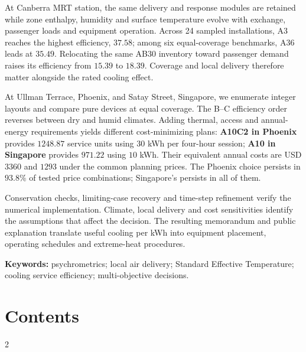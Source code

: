\documentclass[12pt]{article}
\begin{document}
At Canberra MRT station, the same delivery and response modules are retained while zone enthalpy, humidity and surface temperature evolve with exchange, passenger loads and equipment operation. Across 24 sampled installations, A3 reaches the highest efficiency, $37.58$; among six equal-coverage benchmarks, A36 leads at $35.49$. Relocating the same AB30 inventory toward passenger demand raises its efficiency from $15.39$ to $18.39$. Coverage and local delivery therefore matter alongside the rated cooling effect.

At Ullman Terrace, Phoenix, and Satay Street, Singapore, we enumerate integer layouts and compare pure devices at equal coverage. The B--C efficiency order reverses between dry and humid climates. Adding thermal, access and annual-energy requirements yields different cost-minimizing plans: \textbf{A10C2 in Phoenix} provides $1248.87$ service units using $30$ kWh per four-hour session; \textbf{A10 in Singapore} provides $971.22$ using $10$ kWh. Their equivalent annual costs are USD $3360$ and $1293$ under the common planning prices. The Phoenix choice persists in $93.8\%$ of tested price combinations; Singapore's persists in all of them.

Conservation checks, limiting-case recovery and time-step refinement verify the numerical implementation. Climate, local delivery and cost sensitivities identify the assumptions that affect the decision. The resulting memorandum and public explanation translate useful cooling per kWh into equipment placement, operating schedules and extreme-heat procedures.

\noindent\textbf{Keywords:} psychrometrics; local air delivery; Standard Effective Temperature; cooling service efficiency; multi-objective decisions.

\newpage
\pagestyle{fancy}
\setcounter{tocdepth}{1}
\section*{Contents}
{\fontsize{10}{11.5}\selectfont
\setlength{\cftbeforesecskip}{1pt}
\begin{multicols}{2}
\makeatletter{}\makeatother
\end{multicols}}
\vspace{4pt}
\clearpage
\clearpage
{}

\clearpage

\FloatBarrier
{}
\clearpage
{}

\clearpage
{}

\end{document}
